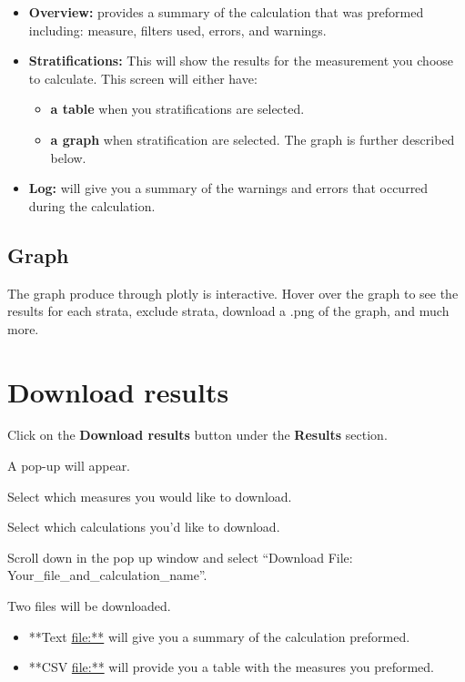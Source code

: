 \documentclass[]{book}
\providecommand{\tightlist}{%
  \setlength{\itemsep}{0pt}\setlength{\parskip}{0pt}}
\begin{document}
\begin{itemize}
\item
  \textbf{Overview:} provides a summary of the calculation that was
  preformed including: measure, filters used, errors, and warnings.
\item
  \textbf{Stratifications:} This will show the results for the
  measurement you choose to calculate. This screen will either have:

  \begin{itemize}
  \tightlist
  \item
    \textbf{a table} when you stratifications are selected.
  \item
    \textbf{a graph} when stratification are selected. The graph is
    further described below.
  \end{itemize}
\item
  \textbf{Log:} will give you a summary of the warnings and errors that
  occurred during the calculation.
\end{itemize}

\subsection{Graph}\label{graph}

The graph produce through plotly is interactive. Hover over the graph to
see the results for each strata, exclude strata, download a .png of the
graph, and much more.

\section{Download results}\label{download-results}

Click on the \textbf{Download results} button under the \textbf{Results}
section.

A pop-up will appear.

Select which measures you would like to download.

Select which calculations you'd like to download.

Scroll down in the pop up window and select ``Download File:
Your\_file\_and\_calculation\_name''.

Two files will be downloaded.

\begin{itemize}
\tightlist
\item
  **Text \url{file:**} will give you a summary of the calculation
  preformed.
\item
  **CSV \url{file:**} will provide you a table with the measures you
  preformed.
\end{itemize}
\end{document}
